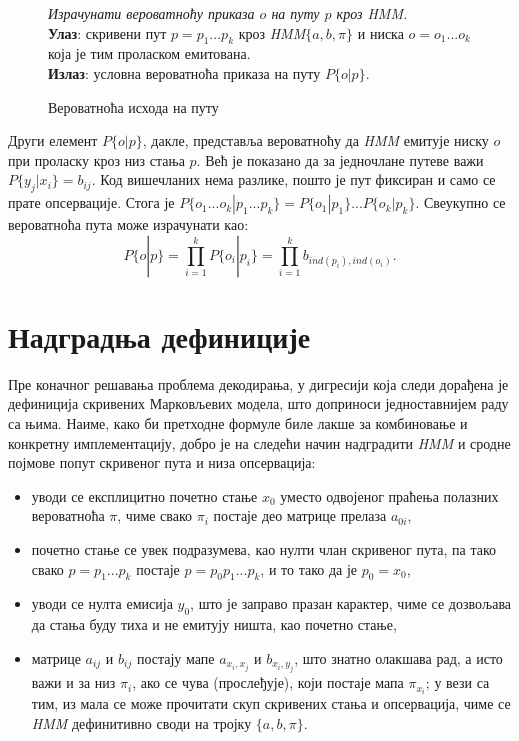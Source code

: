 \documentclass[12pt,oneside]{memoir}
\newenvironment{problem}[1][!ht]
{\renewcommand{\algorithmcfname}{Проблем}
\begin{figure}[!ht]
\centering
  \begin{minipage}{.94\linewidth}
	\begin{algorithm}[#1]%
  }{\end{algorithm}
  \end{minipage}
\end{figure}}
\begin{document}
\begin{CJK}{UTF8}{ipxm}
\begin{problem}[H]
  \SetAlgoLined
  \textit{Израчунати вероватноћу приказа $o$ на путу $p$ кроз \textit{HMM}.}\\
  \textbf{Улаз}: скривени пут $p = p_1...p_k$ кроз \textit{HMM}$\{a, b, \pi\}$ и ниска $o = o_1...o_k$ која је тим проласком емитована.\\
  \textbf{Излаз}: условна вероватноћа приказа на путу $P\{o | p\}$.
  \caption{Вероватноћа исхода на путу\cite{ba10b}}
  \label{prob:ishod}
\end{problem}

Други елемент $P\{o | p\}$, дакле, представља вероватноћу да \textit{HMM} емитује ниску $o$ при проласку кроз низ стања $p$. Већ је показано да за једночлане путеве важи $P\{y_j | x_i\} = b_{ij}$. Код вишечланих нема разлике, пошто је пут фиксиран и само се прате опсервације. Стога је $P\{o_1...o_k | p_1...p_k\} = P\{o_1 | p_1\}...P\{o_k | p_k\}$. Свеукупно се вероватноћа пута може израчунати као: $$P\{o | p\} = \prod_{i=1}^{k} P\{o_i | p_i\} = \prod_{i=1}^{k} b_{ind(p_i), ind(o_i)}.$$

\section{Надградња дефиниције}
Пре коначног решавања проблема декодирања, у дигресији која следи дорађена је дефиниција скривених Марковљевих модела, што доприноси једноставнијем раду са њима. Наиме, како би претходне формуле биле лакше за комбиновање и конкретну имплементацију, добро је на следећи начин надградити \textit{HMM} и сродне појмове попут скривеног пута и низа опсервација:
\begin{itemize}
  \item уводи се експлицитно почетно стање $x_0$ уместо одвојеног праћења полазних вероватноћа $\pi$, чиме свако $\pi_i$ постаје део матрице прелаза $a_{0i}$,
  \item почетно стање се увек подразумева, као нулти члан скривеног пута, па тако свако $p = p_1...p_k$ постаје $p = p_0p_1...p_k$, и то тако да је $p_0 = x_0$,
  \item уводи се нулта емисија $y_0$, што је заправо празан карактер, чиме се дозвољава да стања буду тиха и не емитују ништа, као почетно стање,
  \item матрице $a_{ij}$ и $b_{ij}$ постају мапе $a_{x_i, x_j}$ и $b_{x_i, y_j}$, што знатно олакшава рад, а исто важи и за низ $\pi_i$, ако се чува (прослеђује), који постаје мапа $\pi_{x_i}$; у вези са тим, из мала се може прочитати скуп скривених стања и опсервација, чиме се \textit{HMM} дефинитивно своди на тројку $\{a, b, \pi\}$.
\end{itemize}


\end{CJK}
\end{document}
